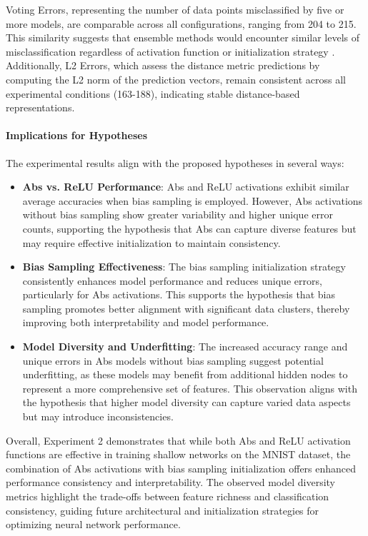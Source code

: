 Voting Errors, representing the number of data points misclassified by five or more models, are comparable across all configurations, ranging from 204 to 215. This similarity suggests that ensemble methods would encounter similar levels of misclassification regardless of activation function or initialization strategy \cite{dietterich2000ensemble}. Additionally, L2 Errors, which assess the distance metric predictions by computing the L2 norm of the prediction vectors, remain consistent across all experimental conditions (163-188), indicating stable distance-based representations.

\paragraph{Implications for Hypotheses}

The experimental results align with the proposed hypotheses in several ways:

\begin{itemize}
    \item \textbf{Abs vs. ReLU Performance}: Abs and ReLU activations exhibit similar average accuracies when bias sampling is employed. However, Abs activations without bias sampling show greater variability and higher unique error counts, supporting the hypothesis that Abs can capture diverse features but may require effective initialization to maintain consistency.
    
    \item \textbf{Bias Sampling Effectiveness}: The bias sampling initialization strategy consistently enhances model performance and reduces unique errors, particularly for Abs activations. This supports the hypothesis that bias sampling promotes better alignment with significant data clusters, thereby improving both interpretability and model performance.
    
    \item \textbf{Model Diversity and Underfitting}: The increased accuracy range and unique errors in Abs models without bias sampling suggest potential underfitting, as these models may benefit from additional hidden nodes to represent a more comprehensive set of features. This observation aligns with the hypothesis that higher model diversity can capture varied data aspects but may introduce inconsistencies.
\end{itemize}

Overall, Experiment 2 demonstrates that while both Abs and ReLU activation functions are effective in training shallow networks on the MNIST dataset, the combination of Abs activations with bias sampling initialization offers enhanced performance consistency and interpretability. The observed model diversity metrics highlight the trade-offs between feature richness and classification consistency, guiding future architectural and initialization strategies for optimizing neural network performance.



